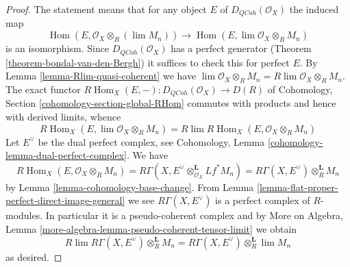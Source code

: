 \documentclass{stacks-project}
\theoremstyle{plain}
\theoremstyle{definition}
\theoremstyle{remark}
\numberwithin{equation}{subsection}
\def\lim{\mathop{\mathrm{lim}}\nolimits}
\def\Hom{\mathop{\mathrm{Hom}}\nolimits}
\def\QCoh{\mathit{QCoh}}
\begin{document}
\begin{proof}
The statement means that for any object $E$ of
$D_\QCoh(\mathcal{O}_X)$ the induced map
$$
\Hom(E, \mathcal{O}_X \otimes_R (\lim M_n))
\longrightarrow
\Hom(E, \lim \mathcal{O}_X \otimes_R M_n)
$$
is an isomorphism. Since $D_\QCoh(\mathcal{O}_X)$ has
a perfect generator (Theorem \ref{theorem-bondal-van-den-Bergh})
it suffices to check this for perfect $E$.
By Lemma \ref{lemma-Rlim-quasi-coherent} we have
$\lim \mathcal{O}_X \otimes_R M_n = R\lim \mathcal{O}_X \otimes_R M_n$.
The exact functor
$R\Hom_X(E, -) : D_\QCoh(\mathcal{O}_X) \to D(R)$
of Cohomology, Section \ref{cohomology-section-global-RHom}
commutes with products and hence with derived limits, whence
$$
R\Hom_X(E, \lim \mathcal{O}_X \otimes_R M_n) =
R\lim R\Hom_X(E, \mathcal{O}_X \otimes_R M_n)
$$
Let $E^\vee$ be the dual perfect complex, see
Cohomology, Lemma \ref{cohomology-lemma-dual-perfect-complex}.
We have
$$
R\Hom_X(E, \mathcal{O}_X \otimes_R M_n) =
R\Gamma(X, E^\vee \otimes_{\mathcal{O}_X}^\mathbf{L} Lf^*M_n) =
R\Gamma(X, E^\vee) \otimes_R^\mathbf{L} M_n
$$
by Lemma \ref{lemma-cohomology-base-change}.
From Lemma \ref{lemma-flat-proper-perfect-direct-image-general}
we see $R\Gamma(X, E^\vee)$ is a perfect complex of $R$-modules.
In particular it is a pseudo-coherent complex and by
More on Algebra, Lemma \ref{more-algebra-lemma-pseudo-coherent-tensor-limit}
we obtain
$$
R\lim R\Gamma(X, E^\vee) \otimes_R^\mathbf{L} M_n =
R\Gamma(X, E^\vee) \otimes_R^\mathbf{L} \lim M_n
$$
as desired.
\end{proof}
\end{document}
